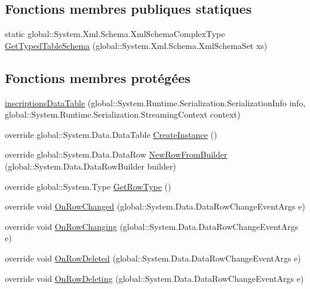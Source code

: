 \subsection*{Fonctions membres publiques statiques}
\begin{DoxyCompactItemize}
\item 
static global\+::\+System.\+Xml.\+Schema.\+Xml\+Schema\+Complex\+Type \hyperlink{classforma_1_1formadb_data_set_1_1inscriptions_data_table_ac3c260a406c6e75b9219817fcfe2e5ed}{Get\+Typed\+Table\+Schema} (global\+::\+System.\+Xml.\+Schema.\+Xml\+Schema\+Set xs)
\end{DoxyCompactItemize}
\subsection*{Fonctions membres protégées}
\begin{DoxyCompactItemize}
\item 
\hyperlink{classforma_1_1formadb_data_set_1_1inscriptions_data_table_ab678b55e3b2f79473b1baabdcc328125}{inscriptions\+Data\+Table} (global\+::\+System.\+Runtime.\+Serialization.\+Serialization\+Info info, global\+::\+System.\+Runtime.\+Serialization.\+Streaming\+Context context)
\item 
override global\+::\+System.\+Data.\+Data\+Table \hyperlink{classforma_1_1formadb_data_set_1_1inscriptions_data_table_a83b20b104f5a06d8d620d4e6ed39fd92}{Create\+Instance} ()
\item 
override global\+::\+System.\+Data.\+Data\+Row \hyperlink{classforma_1_1formadb_data_set_1_1inscriptions_data_table_ab1f3598367a60a23126971075bcb242f}{New\+Row\+From\+Builder} (global\+::\+System.\+Data.\+Data\+Row\+Builder builder)
\item 
override global\+::\+System.\+Type \hyperlink{classforma_1_1formadb_data_set_1_1inscriptions_data_table_a1b0d9edb9931a023e84c9152ad75a1cb}{Get\+Row\+Type} ()
\item 
override void \hyperlink{classforma_1_1formadb_data_set_1_1inscriptions_data_table_acca300d6e141c02534ef492cd678ba59}{On\+Row\+Changed} (global\+::\+System.\+Data.\+Data\+Row\+Change\+Event\+Args e)
\item 
override void \hyperlink{classforma_1_1formadb_data_set_1_1inscriptions_data_table_a799855c323930b18e988ac2715be0925}{On\+Row\+Changing} (global\+::\+System.\+Data.\+Data\+Row\+Change\+Event\+Args e)
\item 
override void \hyperlink{classforma_1_1formadb_data_set_1_1inscriptions_data_table_acec3e4e271c377641c6af72ec3d0cbb6}{On\+Row\+Deleted} (global\+::\+System.\+Data.\+Data\+Row\+Change\+Event\+Args e)
\item 
override void \hyperlink{classforma_1_1formadb_data_set_1_1inscriptions_data_table_a47e3703a69e05d20660a1549ea22dce0}{On\+Row\+Deleting} (global\+::\+System.\+Data.\+Data\+Row\+Change\+Event\+Args e)
\end{DoxyCompactItemize}
